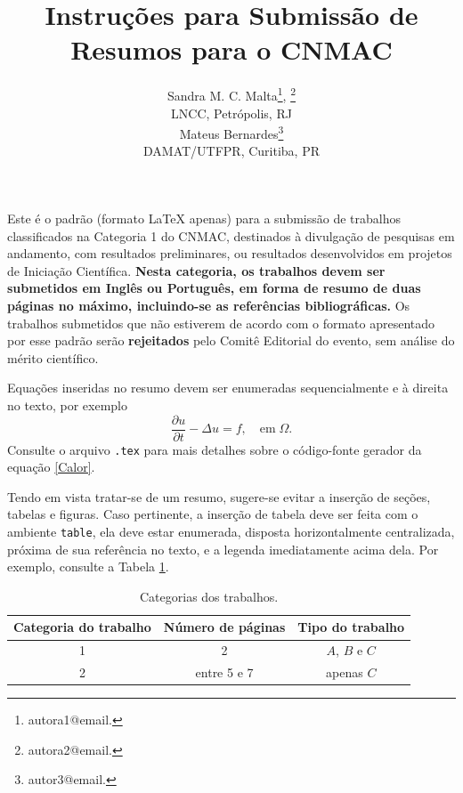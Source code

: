 \documentclass[a4,11pt]{pssbmac}
\begin{document}
\title{Instruções para Submissão de Resumos para o CNMAC}

\author{
    {\large Sandra M. C. Malta}\thanks{autora1@email.}, {\color{red}{\large Sandra M. C. Malta}\thanks{autora2@email.}}\\
    {\small LNCC, Petrópolis, RJ} \\
    {\large Mateus Bernardes}\thanks{autor3@email.}  \\
    {\small DAMAT/UTFPR, Curitiba, PR} \\
}
\criartitulo

Este é o padrão (formato {\LaTeX} apenas) para a submissão de trabalhos classificados na Categoria 1 do CNMAC, destinados à divulgação de pesquisas em andamento, com resultados preliminares, ou resultados desenvolvidos em projetos de Iniciação Científica. {\bf Nesta categoria, os trabalhos devem ser submetidos em Inglês ou Português, em forma de resumo de duas páginas no máximo, incluindo-se as referências bibliográficas.} Os trabalhos submetidos que não estiverem de acordo com o formato apresentado por esse padrão serão {\bf rejeitados} pelo Comitê Editorial do evento, sem análise do mérito científico.

Equações inseridas no resumo devem ser enumeradas sequencialmente e à direita no texto, por exemplo
\begin{equation}
\frac{\partial u}{\partial t}-\Delta u = f, \quad  \mathrm{em} \; \Omega. \label{Calor}
\end{equation}
Consulte o arquivo \verb!.tex! para mais detalhes sobre o código-fonte gerador da equação \eqref{Calor}.

Tendo em vista tratar-se de um resumo, sugere-se evitar a inserção de seções, tabelas e figuras. Caso pertinente, a inserção de tabela deve ser feita com o ambiente \verb!table!, ela deve estar enumerada, disposta horizontalmente centralizada, próxima de sua referência no texto, e a legenda imediatamente acima dela. Por exemplo, consulte a Tabela \ref{tabela01}.

\begin{table}[H]
\caption{ {\small Categorias dos trabalhos.}}
\centering
\begin{tabular}{ccc}
\hline
Categoria do trabalho  & Número de páginas & Tipo do trabalho\\ \hline
1          & 2  & $A$, $B$ e $C$    \\
2          & entre 5 e 7  & apenas $C$ \\
\hline
\end{tabular}\label{tabela01}
\end{table}
\end{document}
